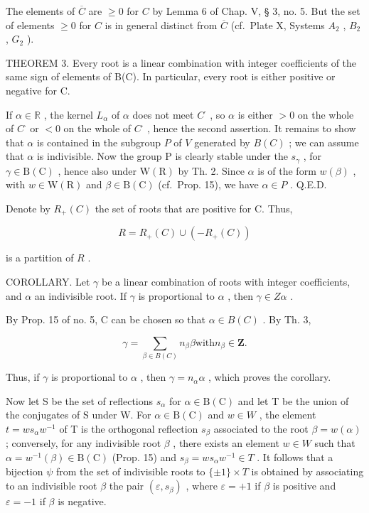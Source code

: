 The elements of \(\overline{C}\) are \(\geqslant 0\) for \(C\) by Lemma 6 of Chap. V, § 3, no. 5. But the set of elements \(\geqslant 0\) for \(C\) is in general distinct from \(\overline{C}\) (cf.~Plate X, Systems \(A_2\) , \(B_2\) , \(G_2\) ).

THEOREM 3. Every root is a linear combination with integer coefficients of the same sign of elements of B(C). In particular, every root is either positive or negative for C.

If \(\alpha \in \mathbb{R}\) , the kernel \(L_{\alpha}\) of \(\alpha\) does not meet \(C^{\cdot}\) , so \(\alpha\) is either \(>0\) on the whole of \(C^{\cdot}\) or \(< 0\) on the whole of \(C^{\cdot}\) , hence the second assertion. It remains to show that \(\alpha\) is contained in the subgroup \(P\) of \(V\) generated by \(B(C)\) ; we can assume that \(\alpha\) is indivisible. Now the group P is clearly stable under the \(s_{\gamma}\) , for \(\gamma \in \mathrm{B}(\mathrm{C})\) , hence also under \(\mathrm{W}(\mathrm{R})\) by Th. 2. Since \(\alpha\) is of the form \(w(\beta)\) , with \(w \in \mathrm{W}(\mathrm{R})\) and \(\beta \in \mathrm{B}(\mathrm{C})\) (cf.~Prop. 15), we have \(\alpha \in P\) . Q.E.D.

Denote by \(R_{+}(C)\) the set of roots that are positive for C. Thus,

\[
R = R _ {+} (C) \cup (- R _ {+} (C))
\]

is a partition of \(R\) .

COROLLARY. Let \(\gamma\) be a linear combination of roots with integer coefficients, and \(\alpha\) an indivisible root. If \(\gamma\) is proportional to \(\alpha\) , then \(\gamma \in Z\alpha\) .

By Prop. 15 of no. 5, C can be chosen so that \(\alpha \in B(C)\) . By Th. 3,

\[
\gamma = \sum_ {\beta \in B (C)} n _ {\beta} \beta \text {with} n _ {\beta} \in \mathbf {Z}.
\]

Thus, if \(\gamma\) is proportional to \(\alpha\) , then \(\gamma = n_{\alpha}\alpha\) , which proves the corollary.

Now let S be the set of reflections \(s_{\alpha}\) for \(\alpha \in \mathrm{B}(\mathrm{C})\) and let T be the union of the conjugates of S under W. For \(\alpha \in \mathrm{B}(\mathrm{C})\) and \(w \in W\) , the element \(t = ws_{\alpha}w^{-1}\) of T is the orthogonal reflection \(s_{\beta}\) associated to the root \(\beta = w(\alpha)\) ; conversely, for any indivisible root \(\beta\) , there exists an element \(w \in W\) such that \(\alpha = w^{-1}(\beta) \in \mathrm{B}(\mathrm{C})\) (Prop. 15) and \(s_{\beta} = ws_{\alpha}w^{-1} \in T\) . It follows that a bijection \(\psi\) from the set of indivisible roots to \(\{\pm1\} \times T\) is obtained by associating to an indivisible root \(\beta\) the pair \((\varepsilon, s_{\beta})\) , where \(\varepsilon = +1\) if \(\beta\) is positive and \(\varepsilon = -1\) if \(\beta\) is negative.


